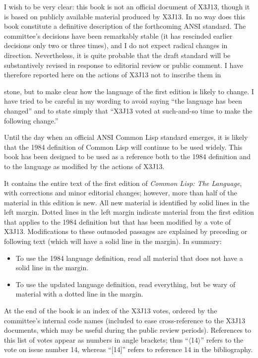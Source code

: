 I wish to be very clear: this book is not an official document
of X3J13, though it is based on publicly available material
produced by X3J13.  In no way does this book constitute a definitive
description of the forthcoming ANSI standard.  The
committee's decisions have been remarkably stable (it has rescinded
earlier decisions only two or three times), and I do not
expect radical changes in direction.
Nevertheless, it is quite probable
that the draft standard will be substantively revised in response to
editorial review or public comment.
I have therefore reported here on the actions of X3J13 not to
inscribe them in \strut stone, but to make clear how the language
of the first edition is likely to change.
I have tried to be careful
in my wording to avoid saying ``the language has been changed''
and to state simply that
``X3J13 voted at such-and-so time to make the following change.''

Until the day when an official ANSI Common Lisp standard emerges,
it is likely that the 1984 definition of Common Lisp will
continue to be used widely.  This book has been designed
to be used as a reference both to the 1984 definition
and to the language as modified by the actions of X3J13.

It contains the entire text of the first edition
of \emph{Common Lisp: The Language}, with corrections
and minor editorial changes;
however, more than half of the material in this edition is new.
All new material is
identified by solid lines
in the left margin.
Dotted lines in the left margin indicate material from the first edition
that applies to the 1984 definition but that has been modified
by a vote of X3J13.  Modifications to these outmoded
passages are explained by preceding or following text (which will
have a solid line in the margin).
In summary:
\begin{itemize}
\item To use the 1984 language definition, read all material that does not
have a solid line in the margin.
\item To use the updated language definition, read everything, but
be wary of material with a dotted line in the margin.
\end{itemize}

At the end of the book is an index of the X3J13 votes, ordered
by the committee's internal code names (included to ease cross-reference
to the X3J13 documents, which may be useful during the public review
periods).  References to this list of votes appear as numbers
in angle brackets; thus
``$\langle$14$\rangle$'' refers to the vote on issue number 14, whereas
``[14]'' refers to reference 14 in the bibliography.

